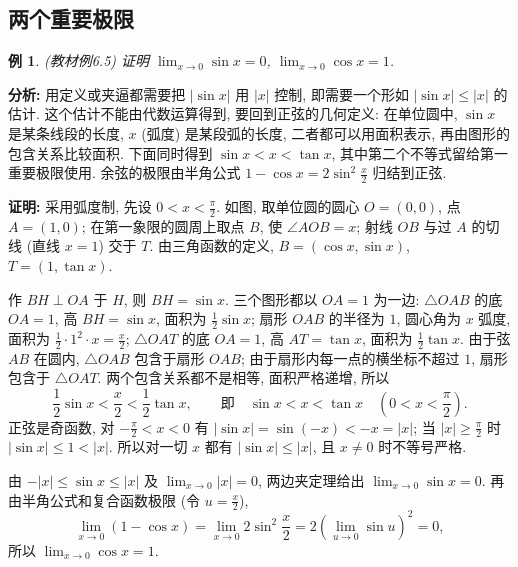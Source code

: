 \documentclass[UTF8,openany]{ctexbook}
\theoremstyle{chinesetextbook}
\newtheorem{example}{例}[section]
\newenvironment{cnproof}{\par\indent\textbf{证明:} \ignorespaces}{\par}
\begin{document}
\subsection{两个重要极限}
\begin{example}
\textnormal{(教材例6.5)} 证明 $\displaystyle \lim_{x\to0}\sin x=0$, $\displaystyle \lim_{x\to0}\cos x=1$.
\end{example}
\par\indent\textbf{分析:} 用定义或夹逼都需要把 $|\sin x|$ 用 $|x|$ 控制, 即需要一个形如 $|\sin x|\le|x|$ 的估计. 这个估计不能由代数运算得到, 要回到正弦的几何定义: 在单位圆中, $\sin x$ 是某条线段的长度, $x$ (弧度) 是某段弧的长度, 二者都可以用面积表示, 再由图形的包含关系比较面积. 下面同时得到 $\sin x<x<\tan x$, 其中第二个不等式留给第一重要极限使用. 余弦的极限由半角公式 $1-\cos x=2\sin^2\frac x2$ 归结到正弦.
\begin{cnproof}
采用弧度制, 先设 $\displaystyle0<x<\frac\pi2$. 如图, 取单位圆的圆心 $O=(0,0)$, 点 $A=(1,0)$; 在第一象限的圆周上取点 $B$, 使 $\angle AOB=x$; 射线 $OB$ 与过 $A$ 的切线 (直线 $x=1$) 交于 $T$. 由三角函数的定义, $B=(\cos x,\sin x)$, $T=(1,\tan x)$.
\begin{center}
\end{center}
作 $BH\perp OA$ 于 $H$, 则 $BH=\sin x$. 三个图形都以 $OA=1$ 为一边: $\triangle OAB$ 的底 $OA=1$, 高 $BH=\sin x$, 面积为 $\displaystyle\frac12\sin x$; 扇形 $OAB$ 的半径为 $1$, 圆心角为 $x$ 弧度, 面积为 $\displaystyle\frac12\cdot1^2\cdot x=\frac x2$; $\triangle OAT$ 的底 $OA=1$, 高 $AT=\tan x$, 面积为 $\displaystyle\frac12\tan x$. 由于弦 $AB$ 在圆内, $\triangle OAB$ 包含于扇形 $OAB$; 由于扇形内每一点的横坐标不超过 $1$, 扇形包含于 $\triangle OAT$. 两个包含关系都不是相等, 面积严格递增, 所以
\[
\frac12\sin x<\frac x2<\frac12\tan x,
\qquad\text{即}\quad \sin x<x<\tan x\quad\left(0<x<\frac\pi2\right).
\]
正弦是奇函数, 对 $\displaystyle-\frac\pi2<x<0$ 有 $|\sin x|=\sin(-x)<-x=|x|$; 当 $\displaystyle|x|\ge\frac\pi2$ 时 $|\sin x|\le1<|x|$. 所以对一切 $x$ 都有 $|\sin x|\le|x|$, 且 $x\ne0$ 时不等号严格.

由 $-|x|\le\sin x\le|x|$ 及 $\displaystyle\lim_{x\to0}|x|=0$, 两边夹定理给出 $\displaystyle\lim_{x\to0}\sin x=0$. 再由半角公式和复合函数极限 (令 $\displaystyle u=\frac x2$),
\[
\lim_{x\to0}(1-\cos x)
=\lim_{x\to0}2\sin^2\frac x2
=2\left(\lim_{u\to0}\sin u\right)^2=0,
\]
所以 $\displaystyle\lim_{x\to0}\cos x=1$.
\end{cnproof}
\end{document}
